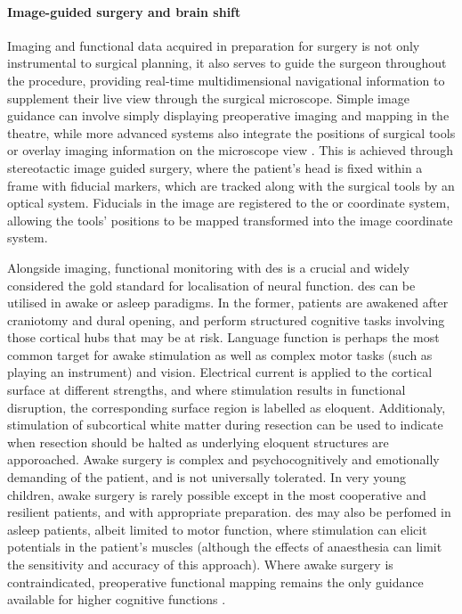 \paragraph*{Image-guided surgery and brain shift}

Imaging and functional data acquired in preparation for surgery is not only instrumental to surgical planning, it also serves to guide the surgeon throughout the procedure, providing real-time multidimensional navigational information to supplement their live view through the surgical microscope.
Simple image guidance can involve simply displaying preoperative imaging and mapping in the theatre, while more advanced systems also integrate the positions of surgical tools or overlay imaging information on the microscope view .
This is achieved through stereotactic image guided surgery, where the patient's head is fixed within a frame with fiducial markers, which are tracked along with the surgical tools by an optical system.
Fiducials in the image are registered to the \gls{or} coordinate system, allowing the tools' positions to be mapped transformed into the image coordinate system.

Alongside imaging, functional monitoring with \gls{des} is a crucial  and widely considered the gold standard for localisation of neural function.
\gls{des} can be utilised in awake or asleep paradigms.
In the former, patients are awakened after craniotomy and dural opening, and perform structured cognitive tasks involving those cortical hubs that may be at risk.
Language function is perhaps the most common target for awake stimulation as well as complex motor tasks (such as playing an instrument) and vision\autocite{Mazerand2017}.
Electrical current is applied to the cortical surface at different  strengths, and where stimulation results in functional disruption, the corresponding surface region is labelled as eloquent. 
Additionaly, stimulation of subcortical white matter during resection can be used to indicate when resection should be halted as underlying eloquent structures are apporoached.
Awake surgery is complex and psychocognitively and emotionally demanding of the patient, and is not universally tolerated.
In very young children, awake surgery is rarely possible except in the most cooperative and resilient patients, and with appropriate preparation\autocite{Zolotova2022}.
\gls{des} may also be perfomed in asleep patients, albeit limited to motor function, where stimulation can elicit potentials in the patient's muscles (although the effects of anaesthesia can limit the sensitivity and accuracy of this approach\autocite{WeissLucas2020}). 
Where awake surgery is contraindicated, preoperative functional mapping remains the only guidance available for higher cognitive functions .

